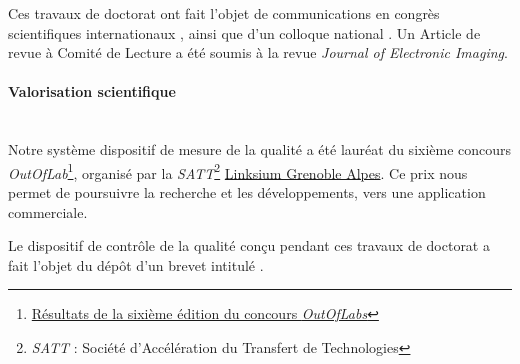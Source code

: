 \bigskip
Ces travaux de doctorat ont fait l’objet de communications en congrès scientifiques internationaux \cite{nagorny_towards_2017, nagorny_injection_2017, nagorny_quality_2017, nagorny_generative_2018, nagorny_polarimetric_2019}, ainsi que d'un colloque national \cite{nagorny_towards_2017}.
Un Article de revue à Comité de Lecture a été soumis à la revue \textit{Journal of Electronic Imaging}.

\bigskip

\paragraph{Valorisation scientifique}\mbox{} \\

Notre système dispositif de mesure de la qualité a été lauréat du sixième concours \textit{OutOfLab}\footnote{\href{http://outoflabs.linksium.fr/resultats/}{Résultats de la sixième édition du concours \textit{OutOfLabs}}}, organisé par la \textit{SATT}\footnote{\textit{SATT} : Société d'Accélération du Transfert de Technologies} \href{https://www.linksium.fr/}{Linksium Grenoble Alpes}.
Ce prix nous permet de poursuivre la recherche et les développements, vers une application commerciale.

Le dispositif de contrôle de la qualité conçu pendant ces travaux de doctorat a fait l'objet du dépôt d'un brevet intitulé  \cite{nagorny_dispositif_2019}.

